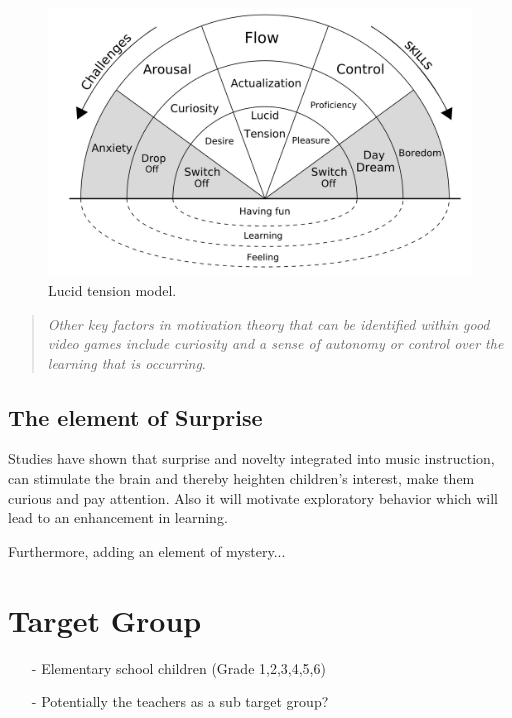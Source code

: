 \begin{figure}[H]
	\centering
	\includegraphics[width=0.7\linewidth]{figure/Analysis/motivation}
	\caption{Lucid tension model.}
	\label{fig:lucidTension}
\end{figure}

\begin{quote}
	\textit{Other key factors in motivation theory that can be identified within good video games include curiosity and a sense of autonomy or control over the learning that is occurring}\cite[p.~92]{interactiveMusicVideoGames}.\\
\end{quote}
\subsection{The element of Surprise}
Studies have shown that surprise and novelty integrated into music instruction, can stimulate the brain and thereby heighten children's interest, make them curious and pay attention\cite{bagpipesSurprise}. Also it will motivate exploratory behavior which will lead to an enhancement in learning.


Furthermore, adding an element of mystery...

\section{Target Group}

\begin{itemize}
	\item[-] Elementary school children (Grade 1,2,3,4,5,6)
	\item[-] Potentially the teachers as a sub target group?
\end{itemize}





